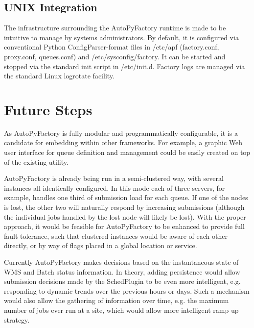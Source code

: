 \documentclass[a4paper]{jpconf}
\begin{document}
\subsection{UNIX Integration}
The infrastructure surrounding the AutoPyFactory runtime is made to be intuitive to
manage by systems administrators. By default, it is configured via conventional
Python ConfigParser-format files in /etc/apf (factory.conf, proxy.conf,
queues.conf) and /etc/sysconfig/factory. It can be started and stopped via the
standard init script in /etc/init.d. Factory logs are managed via the standard
Linux logrotate facility. 

\section{Future Steps}

As AutoPyFactory is fully modular and programmatically configurable, it is a candidate for
embedding within other frameworks. For example, a graphic Web user interface for
queue definition and management could be easily created on top of the existing
utility. 

AutoPyFactory is already being run in a semi-clustered way, with several instances all
identically configured. In this mode each of three servers, for example, handles
one third of submission load for each queue. If one of the nodes is lost, the
other two will naturally respond by increasing submissions (although the
individual jobs handled by the lost node will likely be lost). With the proper
approach, it would be feasible for AutoPyFactory to be enhanced to provide full fault
tolerance, such that clustered instances would be aware of each other directly,
or by way of flags placed in a global location or service. 

Currently AutoPyFactory makes decisions based on the instantaneous state of WMS and Batch
status information. In theory, adding persistence would allow submission
decisions made by the SchedPlugin to be even more intelligent, e.g. responding
to dynamic trends over the previous hours or days. Such a mechanism would also
allow the gathering of information over time, e.g. the maximum number of jobs
ever run at a site, which would allow more intelligent ramp up strategy. 



\end{document}
